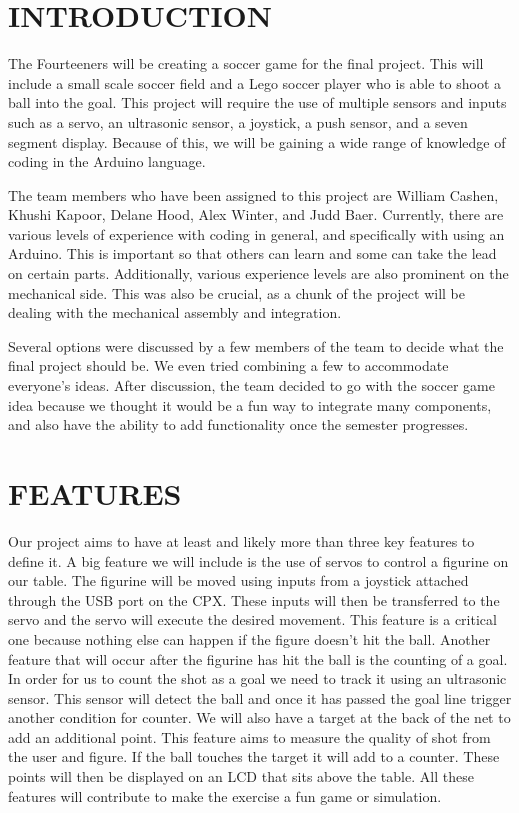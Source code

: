 \documentclass[12pt]{article}
\begin{document}
\section{INTRODUCTION}
The Fourteeners will be creating a soccer game for the final project. This will include a small scale soccer field and a Lego soccer player who is able to shoot a ball into the goal. This project will require the use of multiple sensors and inputs such as a servo, an ultrasonic sensor, a joystick, a push sensor, and a seven segment display. Because of this, we will be gaining a wide range of knowledge of coding in the Arduino language.

The team members who have been assigned to this project are William Cashen, Khushi Kapoor, Delane Hood, Alex Winter, and Judd Baer. Currently, there are various levels of experience with coding in general, and specifically with using an Arduino. This is important so that others can learn and some can take the lead on certain parts. Additionally, various experience levels are also prominent on the mechanical side. This was also be crucial, as a chunk of the project will be dealing with the mechanical assembly and integration.

Several options were discussed by a few members of the team to decide what the final project should be. We even tried combining a few to accommodate everyone's ideas. After discussion, the team decided to go with the soccer game idea because we thought it would be a fun way to integrate many components, and also have the ability to add functionality once the semester progresses.
\section{FEATURES}
Our project aims to have at least and likely more than three key features to define it. A big feature we will include is the use of servos to control a figurine on our table. The figurine will be moved using inputs from a joystick attached through the USB port on the CPX. These inputs will then be transferred to the servo and the servo will execute the desired movement. This feature is a critical one because nothing else can happen if the figure doesn't hit the ball. Another feature that will occur after the figurine has hit the ball is the counting of a goal. In order for us to count the shot as a goal we need to track it using an ultrasonic sensor. This sensor will detect the ball and once it has passed the goal line trigger another condition for counter. We will also have a target at the back of the net to add an additional point. This feature aims to measure the quality of shot from the user and figure. If the ball touches the target it will add to a counter. These points will then be displayed on an LCD that sits above the table. All these features will contribute to make the exercise a fun game or simulation. 
\end{document}

